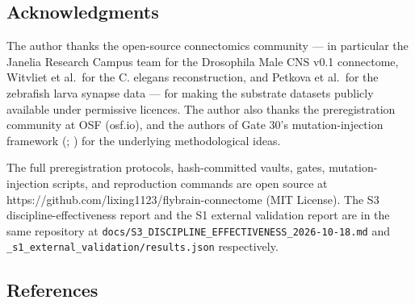 \documentclass[
]{article}
\begin{document}
\subsection{Acknowledgments}\label{acknowledgments}

The author thanks the open-source connectomics community --- in
particular the Janelia Research Campus team for the Drosophila Male CNS
v0.1 connectome, Witvliet et al.~for the C. elegans reconstruction, and
Petkova et al.~for the zebrafish larva synapse data --- for making the
substrate datasets publicly available under permissive licences. The
author also thanks the preregistration community at OSF (osf.io), and
the authors of Gate 30's mutation-injection framework (\citet{ref09}; \citet{ref33}) for the underlying methodological ideas.

The full preregistration protocols, hash-committed vaults, gates,
mutation-injection scripts, and reproduction commands are open source at
https://github.com/lixing1123/flybrain-connectome (MIT License). The S3
discipline-effectiveness report and the S1 external validation report
are in the same repository at
\texttt{docs/S3\_DISCIPLINE\_EFFECTIVENESS\_2026-10-18.md} and
\texttt{\_s1\_external\_validation/results.json} respectively.

\subsection{References}\label{references}
\end{document}
